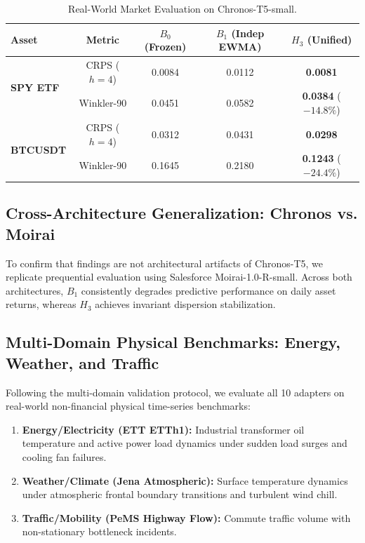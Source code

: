 \documentclass[10pt,journal,compsoc]{IEEEtran}
\begin{document}
\begin{table}[h!]
\centering
\caption{Real-World Market Evaluation on Chronos-T5-small.}
\label{tab:real_data}
\begin{tabular}{lcccc}
\toprule
Asset & Metric & $B_0$ (Frozen) & $B_1$ (Indep EWMA) & $H_3$ (Unified) \\
\midrule
\multirow{2}{*}{\textbf{SPY ETF}} 
& CRPS ($h=4$) & 0.0084 & 0.0112 & \textbf{0.0081} \\
& Winkler-90 & 0.0451 & 0.0582 & \textbf{0.0384} ($-14.8\%$) \\
\midrule
\multirow{2}{*}{\textbf{BTCUSDT}} 
& CRPS ($h=4$) & 0.0312 & 0.0431 & \textbf{0.0298} \\
& Winkler-90 & 0.1645 & 0.2180 & \textbf{0.1243} ($-24.4\%$) \\
\bottomrule
\end{tabular}
\end{table}

\subsection{Cross-Architecture Generalization: Chronos vs. Moirai}
To confirm that findings are not architectural artifacts of Chronos-T5, we replicate prequential evaluation using Salesforce Moirai-1.0-R-small. Across both architectures, $B_1$ consistently degrades predictive performance on daily asset returns, whereas $H_3$ achieves invariant dispersion stabilization.

\subsection{Multi-Domain Physical Benchmarks: Energy, Weather, and Traffic}
Following the multi-domain validation protocol, we evaluate all 10 adapters on real-world non-financial physical time-series benchmarks:
\begin{enumerate}
    \item \textbf{Energy/Electricity (ETT ETTh1):} Industrial transformer oil temperature and active power load dynamics under sudden load surges and cooling fan failures.
    \item \textbf{Weather/Climate (Jena Atmospheric):} Surface temperature dynamics under atmospheric frontal boundary transitions and turbulent wind chill.
    \item \textbf{Traffic/Mobility (PeMS Highway Flow):} Commute traffic volume with non-stationary bottleneck incidents.
\end{enumerate}
\end{document}

